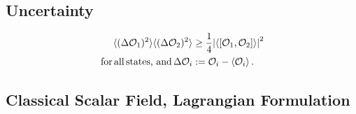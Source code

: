 \subsection{Uncertainty}
\begin{mybox}{}
	\begin{align}
		\langle (\Delta \mathcal{O}_1)^2\rangle \langle (\Delta \mathcal{O}_2)^2 \rangle &\geq \frac{1}{4} \abs{\langle [\mathcal{O}_1,\mathcal{O}_2]\rangle}^2\\
		 \mathrm{\,for\,all\,states,\,and\,} \Delta \mathcal{O}_i&:= \mathcal{O}_i -\expval{\mathcal{O}_i}.\nonumber
	\end{align}
\end{mybox}


\subsection{Classical Scalar Field, Lagrangian Formulation}













